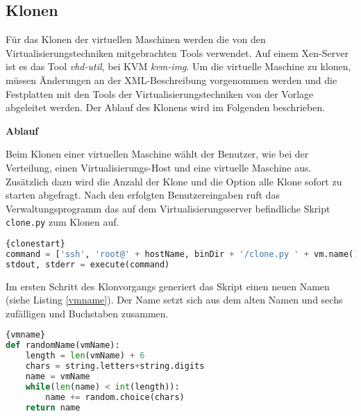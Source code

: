 \subsection{Klonen}
Für das Klonen der virtuellen Maschinen werden die von den Virtualisierungstechniken mitgebrachten Tools verwendet. Auf einem Xen-Server ist es das Tool \textit{vhd-util}, bei KVM \textit{kvm-img}. Um die virtuelle Maschine zu klonen, müssen Änderungen an der XML-Beschreibung vorgenommen werden und die Festplatten mit den Tools der Virtualisierungstechniken von der Vorlage abgeleitet werden. Der Ablauf des Klonens wird im Folgenden beschrieben.  %

\textbf{Ablauf}

Beim Klonen einer virtuellen Maschine wählt der Benutzer, wie bei der Verteilung, einen Virtualisierungs-Host und eine virtuelle Maschine aus. Zusätzlich dazu wird die Anzahl der Klone und die Option alle Klone sofort zu starten abgefragt. Nach den erfolgten Benutzereingaben ruft das Verwaltungsprogramm das auf dem Virtualisierungsserver befindliche Skript \lstinline|clone.py| zum Klonen auf.
\\
\begin{lstlisting}[caption=Starten des Klonvorgangs (cow.py),language=Python,label=clonestart]{clonestart}
command = ['ssh', 'root@' + hostName, binDir + '/clone.py ' + vm.name() + ' ' + cloneCount + ' ' + autostart + ' ' + str(debug)]
stdout, stderr = execute(command)
\end{lstlisting}

Im ersten Schritt des Klonvorgangs generiert das Skript einen neuen Namen (siehe Listing \ref{vmname}). Der Name setzt sich aus dem alten Namen und sechs zufälligen und Buchstaben zusammen.
\\
\begin{lstlisting}[caption=Erstellen des Namens der VM (clone.py),language=Python, label=vmname]{vmname}
def randomName(vmName):
	length = len(vmName) + 6
	chars = string.letters+string.digits
	name = vmName
	while(len(name) < int(length)):
		name += random.choice(chars)
	return name
\end{lstlisting}

